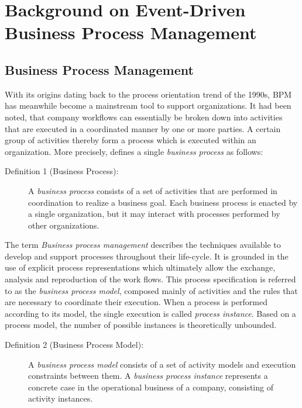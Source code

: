 \chapter{Background on Event-Driven Business Process Management}\label{ch:background}

\section{Business Process Management}\label{ch:bg:bpm}
With its origins dating back to the process orientation trend of the 1990s, \ac{BPM} has meanwhile become a mainstream tool to support organizations.
It had been noted, that company workflows can essentially be broken down into activities that are executed in a coordinated manner by one or more parties.
A certain group of activities thereby form a process which is executed within an organization.
More precisely, \citeauthor{weske:bpm-book} \cite{weske:bpm-book} defines a single \emph{business process} as follows:

\begin{description}
	\item[Definition 1 (Business Process):]
	A \emph{business process} consists of a set of activities that are performed in coordination to realize a business goal. Each business process is enacted by a single organization, but it may interact with processes performed by other organizations.
\end{description}

\noindent The term \emph{Business process management} describes the techniques available to develop and support processes throughout their life-cycle.
It is grounded in the use of explicit process representations which ultimately allow the exchange, analysis and reproduction of the work flows.
This process specification is referred to as the \emph{business process model}, composed mainly of activities and the rules that are necessary to coordinate their execution.
When a process is performed according to its model, the single execution is called \textit{process instance}.
Based on a process model, the number of possible instances is theoretically unbounded.

\begin{description}
	\item[Definition 2 (Business Process Model):]
	A \emph{business process model} consists of a set of activity models and execution constraints between them. A \emph{business process instance} represents a concrete case in the operational business of a company, consisting of activity instances.
	\cite[p.~7]{weske:bpm-book}
\end{description}

